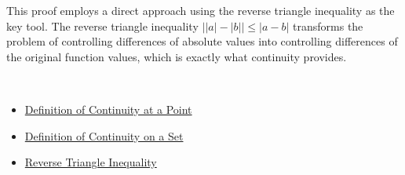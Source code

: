 \begin{remark*}
This proof employs a direct approach using the reverse triangle inequality as the key tool. The reverse triangle inequality $\bigl||a|-|b|\bigr| \le |a-b|$ transforms the problem of controlling differences of absolute values into controlling differences of the original function values, which is exactly what continuity provides.
\end{remark*}

\begin{remark*}[Dependencies]~\\
\begin{itemize}
  \item \hyperref[def:continuous-at-point]{Definition of Continuity at a Point}
  \item \hyperref[def:continuity-on-set]{Definition of Continuity on a Set}
  \item \hyperref[thm:reverse-triangle-inequality]{Reverse Triangle Inequality}
\end{itemize}
\end{remark*}
